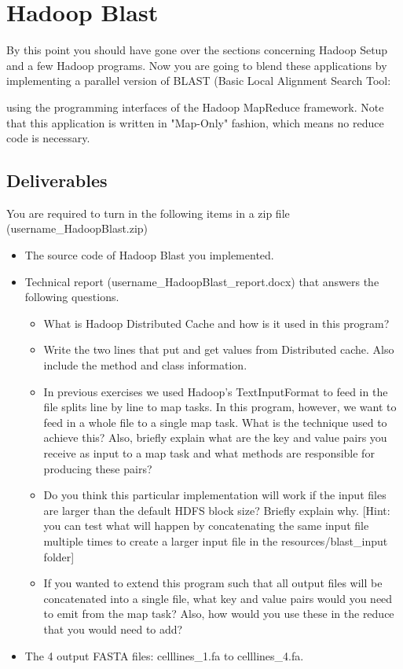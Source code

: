 \section*{Hadoop Blast}
 
By this point you should have gone over the sections concerning Hadoop Setup
and a few Hadoop programs. Now you are going to blend these applications by
implementing a parallel version of BLAST (Basic Local Alignment Search Tool:


using the programming
interfaces of the Hadoop MapReduce framework. Note that this application is
written in "Map-Only" fashion, which means no reduce code is necessary.

\subsection*{Deliverables} 

You are required to turn in the following items in a zip file
(username\_HadoopBlast.zip)

\begin{itemize} 
\item The source code of Hadoop Blast you implemented.
\item	Technical report (username\_HadoopBlast\_report.docx) that answers the
  following questions.

\begin{itemize}
\item What is Hadoop Distributed Cache and how is it used in this program? 
\item Write the two lines that put and get values from Distributed cache. Also
  include the method and class information.

\item In previous exercises we used Hadoop's TextInputFormat to feed in the file
  splits line by line to map tasks. In this program, however, we want to feed
    in a whole file to a single map task. What is the technique used to achieve
    this? Also, briefly explain what are the key and value pairs you receive as
    input to a map task and what methods are responsible for producing these
    pairs?

\item Do you think this particular implementation will work if the input files
  are larger than the default HDFS block size? Briefly explain why. [Hint: you
    can test what will happen by concatenating the same input file multiple
    times to create a larger input file in the resources/blast\_input folder]

\item	If you wanted to extend this program such that all output files will be
  concatenated into a single file, what key and value pairs would you need to
    emit from the map task? Also, how would you use these in the reduce that
    you would need to add?

\end{itemize}
\item	The 4 output FASTA files: celllines\_1.fa to celllines\_4.fa.
\end{itemize}



